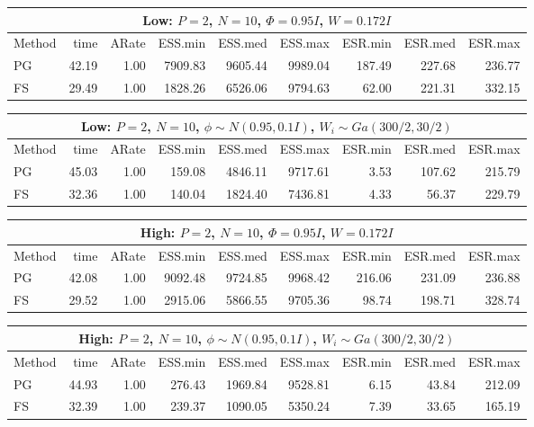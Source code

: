 \documentclass[11pt]{article}
\begin{document}
\begin{table}

\begin{tabular}{l r r r r r r r r } 
\hline
\multicolumn{9}{c}{Low: $P=2$, $N=10$, $\Phi = 0.95I$, $W=0.172 I$} \\
\hline
          Method  &    time  &   ARate  &  ESS.min  &  ESS.med  &  ESS.max  &  ESR.min  &  ESR.med  &  ESR.max  \\ 
             PG   &    42.19 &     1.00 &   7909.83 &   9605.44 &   9989.04 &    187.49 &    227.68 &    236.77 \\ 
             FS   &    29.49 &     1.00 &   1828.26 &   6526.06 &   9794.63 &     62.00 &    221.31 &    332.15
 \end{tabular}

\begin{tabular}{l r r r r r r r r } 
\hline
\multicolumn{9}{c}{Low: $P=2$, $N=10$, $\phi \sim N(0.95, 0.1 I)$, $W_i \sim Ga(300/2, 30/2)$} \\
\hline
          Method  &    time  &   ARate  &  ESS.min  &  ESS.med  &  ESS.max  &  ESR.min  &  ESR.med  &  ESR.max  \\ 
             PG   &    45.03 &     1.00 &    159.08 &   4846.11 &   9717.61 &      3.53 &    107.62 &    215.79 \\ 
             FS   &    32.36 &     1.00 &    140.04 &   1824.40 &   7436.81 &      4.33 &     56.37 &    229.79
 \end{tabular}

\begin{tabular}{l r r r r r r r r } 
\hline
\multicolumn{9}{c}{High: $P=2$, $N=10$, $\Phi = 0.95I$, $W=0.172 I$} \\
\hline
          Method  &    time  &   ARate  &  ESS.min  &  ESS.med  &  ESS.max  &  ESR.min  &  ESR.med  &  ESR.max  \\ 
             PG   &    42.08 &     1.00 &   9092.48 &   9724.85 &   9968.42 &    216.06 &    231.09 &    236.88 \\ 
             FS   &    29.52 &     1.00 &   2915.06 &   5866.55 &   9705.36 &     98.74 &    198.71 &    328.74
 \end{tabular}

\begin{tabular}{l r r r r r r r r } 
\hline
\multicolumn{9}{c}{High: $P=2$, $N=10$, $\phi \sim N(0.95, 0.1 I)$, $W_i \sim Ga(300/2, 30/2)$} \\
\hline
          Method  &    time  &   ARate  &  ESS.min  &  ESS.med  &  ESS.max  &  ESR.min  &  ESR.med  &  ESR.max  \\ 
             PG   &    44.93 &     1.00 &    276.43 &   1969.84 &   9528.81 &      6.15 &     43.84 &    212.09 \\ 
             FS   &    32.39 &     1.00 &    239.37 &   1090.05 &   5350.24 &      7.39 &     33.65 &    165.19
 \end{tabular}


\end{table}
\end{document}
